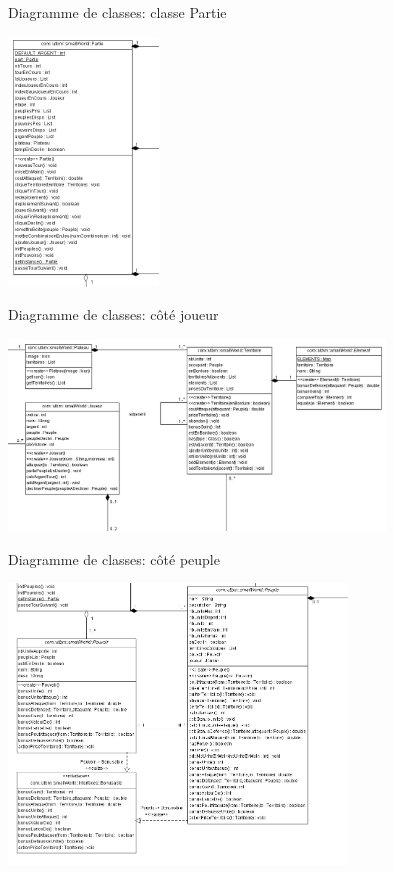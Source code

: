 \documentclass{beamer}
\begin{document}
\begin{frame}{Diagramme de classes: classe Partie}

	\begin{center}
		\includegraphics[width=4cm]{partie.png}
	\end{center}

\end{frame}

\begin{frame}{Diagramme de classes: côté joueur}

	\begin{center}
		\includegraphics[width=10cm]{cotejoueur.png}
	\end{center}

\end{frame}

\begin{frame}{Diagramme de classes: côté peuple}

	\begin{center}
		\includegraphics[width=9cm]{cotepeuple.png}
	\end{center}


\end{frame}
\end{document}
